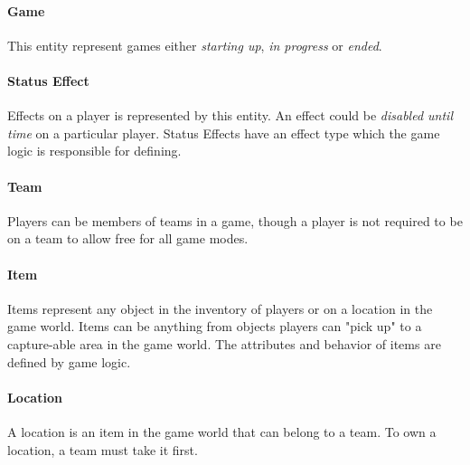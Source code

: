 \paragraph{Game}
This entity represent games either \textit{starting up}, \textit{in progress} or \textit{ended}.

\paragraph{Status Effect}
Effects on a player is represented by this entity. An effect could be \textit{disabled until time} on a particular player. Status Effects have an effect type which the game logic is responsible for defining.

\paragraph{Team}
Players can be members of teams in a game, though a player is not required to be on a team to allow free for all game modes.

\paragraph{Item}
Items represent any object in the inventory of players or on a location in the game world. Items can be anything from objects players can "pick up" to a capture-able area in the game world. The attributes and behavior of items are defined by game logic.

\paragraph{Location}
A location is an item in the game world that can belong to a team. To own a location, a team must take it first.



